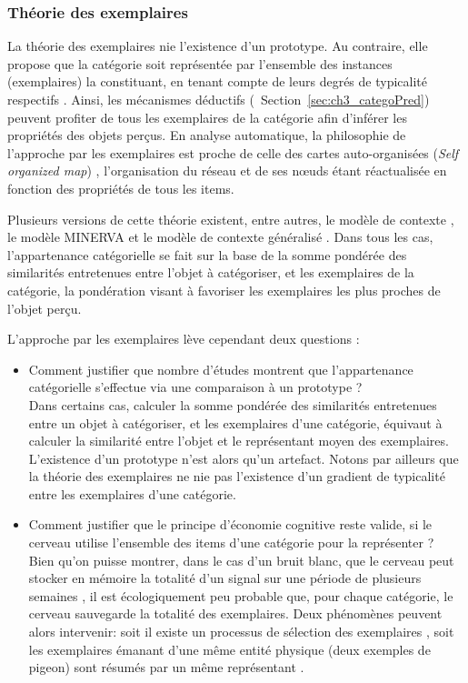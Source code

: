 \subsubsection{Théorie des exemplaires}

La théorie des exemplaires nie l'existence d'un prototype. Au contraire, elle propose que la catégorie soit représentée par l'ensemble des instances (exemplaires) la constituant, en tenant compte de leurs degrés de typicalité respectifs \citep{medin1978context,nosofsky1986attention,nosofsky1992similarity}. Ainsi, les mécanismes déductifs (\cf~Section~\ref{sec:ch3_categoPred}) peuvent profiter de tous les exemplaires de la catégorie afin d'inférer les propriétés des objets perçus. En analyse automatique, la philosophie de l'approche par les exemplaires est proche de celle des cartes auto-organisées (\emph{Self organized map}) \citep{kohonen1995som}, l’organisation du réseau et de ses nœuds étant réactualisée en fonction des propriétés de tous les items.

Plusieurs versions de cette théorie existent, entre autres, le modèle de contexte \citep{medin1978context}, le modèle MINERVA \citep{hitzman1986schema} et le modèle de contexte généralisé \citep{nosofsky1986attention,nosofsky1992similarity}. Dans tous les cas, l'appartenance catégorielle se fait sur la base de la somme pondérée des similarités entretenues entre l'objet à catégoriser, et les exemplaires de la catégorie, la pondération visant à favoriser les exemplaires les plus proches de l'objet perçu.
 
L'approche par les exemplaires lève cependant deux questions \citep{goldstone2003concepts}:

\begin{itemize}
\item Comment justifier que nombre d'études montrent que l'appartenance catégorielle s'effectue via une comparaison à un prototype ? \\
Dans certains cas, calculer la somme pondérée des similarités entretenues entre un objet à catégoriser, et les exemplaires d'une catégorie, équivaut à calculer la similarité entre l'objet et le représentant moyen des exemplaires. L’existence d'un prototype n'est alors qu'un artefact. Notons par ailleurs que la théorie des exemplaires ne nie pas l'existence d'un gradient de typicalité entre les exemplaires d'une catégorie.
\item Comment justifier que le principe d'économie cognitive reste valide, si le cerveau utilise l'ensemble des items d'une catégorie pour la représenter ? \\
Bien qu'on puisse montrer, dans le cas d'un bruit blanc, que le cerveau peut stocker en mémoire la totalité d'un signal sur une période de plusieurs semaines \citep{agus2010rapid}, il est écologiquement peu probable que, pour chaque catégorie, le cerveau sauvegarde la totalité des exemplaires. Deux phénomènes peuvent alors intervenir: soit il existe un processus de sélection des exemplaires \citep{palmeri1995recognition}, soit les exemplaires émanant d'une même entité physique (deux exemples de pigeon) sont résumés par un même représentant \citep{barsalou1998basing}.
\end{itemize}


